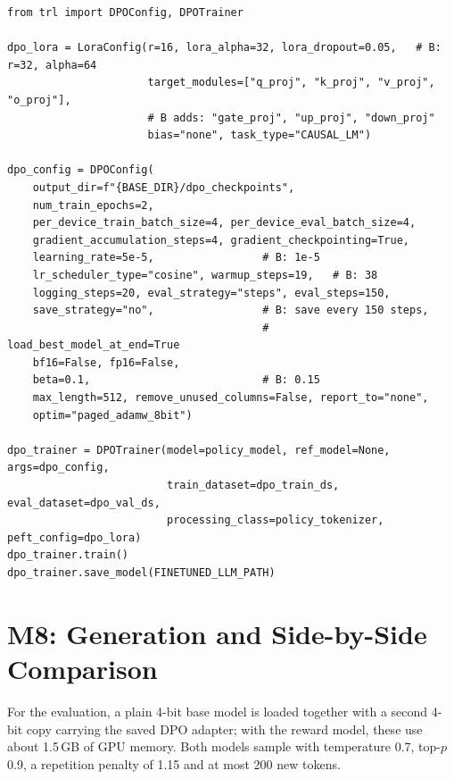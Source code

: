 \begin{lstlisting}[caption={DPO configuration and training (configuration A; configuration B values in comments).}, label={lst:dpotrain}]
from trl import DPOConfig, DPOTrainer

dpo_lora = LoraConfig(r=16, lora_alpha=32, lora_dropout=0.05,   # B: r=32, alpha=64
                      target_modules=["q_proj", "k_proj", "v_proj", "o_proj"],
                      # B adds: "gate_proj", "up_proj", "down_proj"
                      bias="none", task_type="CAUSAL_LM")

dpo_config = DPOConfig(
    output_dir=f"{BASE_DIR}/dpo_checkpoints",
    num_train_epochs=2,
    per_device_train_batch_size=4, per_device_eval_batch_size=4,
    gradient_accumulation_steps=4, gradient_checkpointing=True,
    learning_rate=5e-5,                 # B: 1e-5
    lr_scheduler_type="cosine", warmup_steps=19,   # B: 38
    logging_steps=20, eval_strategy="steps", eval_steps=150,
    save_strategy="no",                 # B: save every 150 steps,
                                        #    load_best_model_at_end=True
    bf16=False, fp16=False,
    beta=0.1,                           # B: 0.15
    max_length=512, remove_unused_columns=False, report_to="none",
    optim="paged_adamw_8bit")

dpo_trainer = DPOTrainer(model=policy_model, ref_model=None, args=dpo_config,
                         train_dataset=dpo_train_ds, eval_dataset=dpo_val_ds,
                         processing_class=policy_tokenizer, peft_config=dpo_lora)
dpo_trainer.train()
dpo_trainer.save_model(FINETUNED_LLM_PATH)
\end{lstlisting}

\section{M8: Generation and Side-by-Side Comparison}
\label{sec:m8}

For the evaluation, a plain 4-bit base model is loaded together with a second 4-bit copy carrying the saved DPO adapter; with the reward model, these use about 1.5\,GB of GPU memory. Both models sample with temperature 0.7, top-$p$ 0.9, a repetition penalty of 1.15 and at most 200 new tokens.

